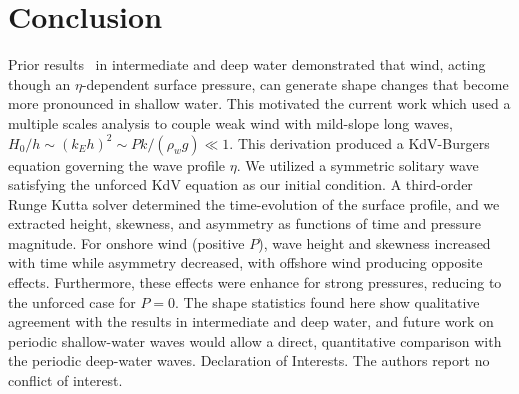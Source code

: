 \documentclass{jfm}
\begin{document}
\section{Conclusion}
Prior results~\citep{zdyrski2020wind} in intermediate and deep water
demonstrated that wind, acting though an $\eta$-dependent surface
pressure, can generate shape changes that become more pronounced in
shallow water.
This motivated the current work which used a multiple scales analysis to
couple weak wind with mild-slope long waves, \ie{} $H_0/h \sim (k_E h)^2
\sim P k/(\rho_w g) \ll 1$.
This derivation produced a KdV-Burgers equation governing the wave
profile $\eta$.
We utilized a symmetric solitary wave satisfying the unforced KdV
equation as our initial condition.
A third-order Runge Kutta solver determined the time-evolution of the
surface profile, and we extracted height, skewness, and asymmetry as
functions of time and pressure magnitude.
For onshore wind (positive $P$), wave height and skewness increased with
time while asymmetry decreased, with offshore wind producing opposite
effects.
Furthermore, these effects were enhance for strong pressures, reducing
to the unforced case for $P=0$.
The shape statistics found here show qualitative agreement with the
results in intermediate and deep water, and future work on periodic
shallow-water waves would allow a direct, quantitative comparison with
the periodic deep-water waves.
Declaration of Interests. The authors report no conflict of interest.

\appendix



\end{document}
